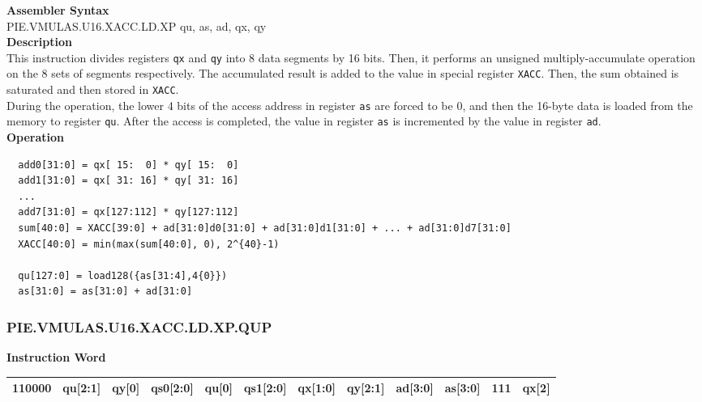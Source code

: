 \textbf{Assembler Syntax} \\
PIE.VMULAS.U16.XACC.LD.XP qu, as, ad, qx, qy \\
\textbf{Description} \\
This instruction divides registers \lstinline{qx} and \lstinline{qy} into 8 data segments by 16 bits. Then, it performs an unsigned multiply-accumulate operation on the 8 sets of segments respectively. The accumulated result is added to the value in special register \lstinline{XACC}. Then, the sum obtained is saturated and then stored in \lstinline{XACC}.\\
During the operation, the lower 4 bits of the access address in register \lstinline{as} are forced to be 0, and then the 16-byte data is loaded from the memory to register \lstinline{qu}. After the access is completed, the value in register \lstinline{as} is incremented by the value in register \lstinline{ad}.\\
\textbf{Operation}
\begin{lstlisting}
  add0[31:0] = qx[ 15:  0] * qy[ 15:  0]
  add1[31:0] = qx[ 31: 16] * qy[ 31: 16]
  ...
  add7[31:0] = qx[127:112] * qy[127:112]
  sum[40:0] = XACC[39:0] + ad[31:0]d0[31:0] + ad[31:0]d1[31:0] + ... + ad[31:0]d7[31:0]
  XACC[40:0] = min(max(sum[40:0], 0), 2^{40}-1)

  qu[127:0] = load128({as[31:4],4{0}})
  as[31:0] = as[31:0] + ad[31:0]
\end{lstlisting}

\newpage
\subsubsection{PIE.VMULAS.U16.XACC.LD.XP.QUP}\label{instruction:PIEVMULASU16XACCLDXPQUP}
\setlength\tabcolsep{6pt}
\textbf{Instruction Word} \\
\begin{tabular}{|c|c|c|c|c|c|c|c|c|c|c|c|}
	\hline
	110000 & qu[2:1] & qy[0] & qs0[2:0] & qu[0] & qs1[2:0] & qx[1:0] & qy[2:1] & ad[3:0] & as[3:0] & 111 & qx[2] \\
	\hline
\end{tabular}


